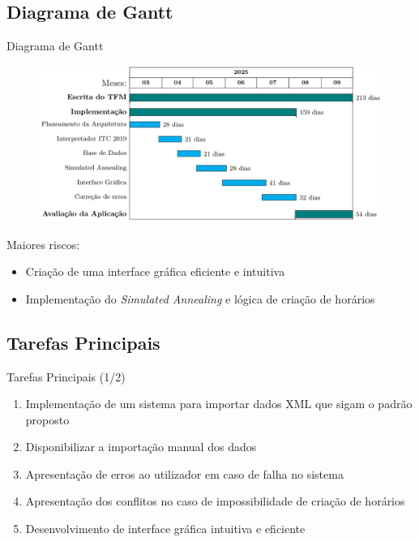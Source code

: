 \documentclass[aspectratio=169]{beamer}
\begin{document}
    \subsection{Diagrama de Gantt}

    \begin{frame}{Diagrama de Gantt}
        \justifying

        \begin{figure}
            \includegraphics[width=.85\linewidth]{img/Diagrama-Gantt.png}
        \end{figure}

        \vfill

        Maiores riscos:
        \begin{itemize}
            \item Criação de uma interface gráfica eficiente e intuitiva
            \item Implementação do \textit{Simulated Annealing} e lógica de criação de horários
        \end{itemize}

        \vfill
    \end{frame}

    \subsection{Tarefas Principais}

    \begin{frame}{Tarefas Principais (1/2)} %
        \justifying
        \begin{enumerate}
            \item Implementação de um sistema para importar dados XML que sigam o padrão proposto
            \item Disponibilizar a importação manual dos dados
            \item Apresentação de erros ao utilizador em caso de falha no sistema
            \item Apresentação dos conflitos no caso de impossibilidade de criação de horários
            \item Desenvolvimento de interface gráfica intuitiva e eficiente
            
            \setcounter{tarefasPrincipais}{\value{enumi}}
        \end{enumerate}
    \end{frame}
\end{document}
